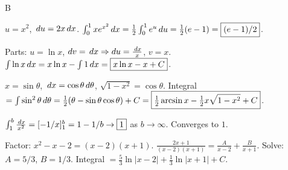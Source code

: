 \documentclass[11pt]{article}
\begin{document}
\begin{answers}{B}
\item $u = x^2$, $\,du = 2x \,dx$. $\int_0^1 x e^{x^2} \,dx = \tfrac{1}{2} \int_0^1 e^u \,du = \tfrac{1}{2}(e - 1) = \boxed{(e-1)/2}$.
\item Parts: $u = \ln x$, $dv = \,dx \Rightarrow du = \tfrac{\,dx}{x}$, $v = x$. $\int \ln x \,dx = x \ln x - \int 1 \,dx = \boxed{x \ln x - x + C}$.
\item $x = \sin\theta$, $\,dx = \cos\theta \,d\theta$, $\sqrt{1-x^2} = \cos\theta$. Integral $= \int \sin^2\theta \,d\theta = \tfrac{1}{2}(\theta - \sin\theta \cos\theta) + C = \boxed{\tfrac{1}{2} \arcsin x - \tfrac{1}{2} x\sqrt{1-x^2} + C}$.
\item $\int_1^b \tfrac{\,dx}{x^2} = [-1/x]_1^b = 1 - 1/b \to \boxed{1}$ as $b \to \infty$. Converges to $1$.
\item Factor: $x^2 - x - 2 = (x-2)(x+1)$. $\tfrac{2x+1}{(x-2)(x+1)} = \tfrac{A}{x-2} + \tfrac{B}{x+1}$. Solve: $A = 5/3$, $B = 1/3$. Integral $= \boxed{\tfrac{5}{3} \ln|x-2| + \tfrac{1}{3} \ln|x+1| + C}$.
\end{answers}
\end{document}
